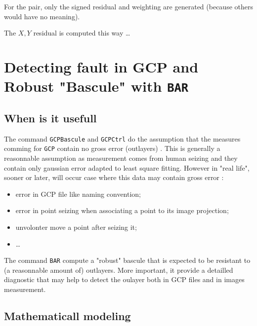 For the pair, only the signed residual and weighting are generated (because others
would have no meaning).

The $X,Y$ residual is computed this way \dots 


\section{Detecting fault in GCP and  Robust "Bascule"  with {\tt BAR}}
\label{Sec:BAR}

\subsection{When is it usefull}

The command {\tt GCPBascule} and {\tt GCPCtrl} do the assumption that the 
measures comming for {\tt GCP} contain no gross error (outlayers) .
This is generally a reasonnable assumption as measurement comes from human seizing and they contain only
gaussian error adapted to least square fitting. However in "real life", sooner or later, will occur case
where this data may contain gross error :

\begin{itemize}
  \item error in GCP file like naming convention;
  \item error in point seizing when associating a point to its image projection;
  \item unvolonter move a point after seizing it;
  \item  \dots
\end{itemize}

The command {\tt BAR} compute a "robust" bascule  that is expected to be resistant
to (a reasonnable amount of) outlayers. More important, it provide a detailled
diagnostic that may help to detect the oulayer both in GCP files and in images
measurement.


\subsection{Mathematicall modeling}

